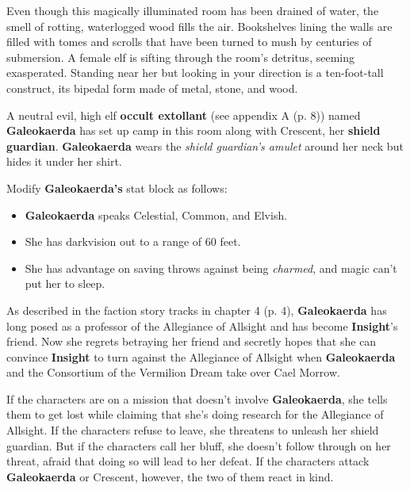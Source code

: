 \documentclass[a4paper, 11pt, bg=full, twocolumn, nooutline]{dndbook}
\begin{document}
\begin{DndReadAloud}
Even though this magically illuminated room has been drained of water, the smell of rotting, waterlogged wood fills the air. Bookshelves lining the walls are filled with tomes and scrolls that have been turned to mush by centuries of submersion.
A female elf is sifting through the room's detritus, seeming exasperated. Standing near her but looking in your direction is a ten-foot-tall construct, its bipedal form made of metal, stone, and wood.
\end{DndReadAloud}

A neutral evil, high elf \textbf{occult extollant} (see appendix A (p. 8)) named \textbf{Galeokaerda} has set up camp in this room along with Crescent, her \textbf{shield guardian}. \textbf{Galeokaerda} wears the \textit{shield guardian's amulet} around her neck but hides it under her shirt.

Modify \textbf{Galeokaerda's} stat block as follows:

\begin{itemize}
\item \textbf{Galeokaerda} speaks Celestial, Common, and Elvish.
\item She has darkvision out to a range of 60 feet.
\item She has advantage on saving throws against being \textit{charmed}, and magic can't put her to sleep.
\end{itemize}

As described in the faction story tracks in chapter 4 (p. 4), \textbf{Galeokaerda} has long posed as a professor of the Allegiance of Allsight and has become \textbf{Insight}'s friend. Now she regrets betraying her friend and secretly hopes that she can convince \textbf{Insight} to turn against the Allegiance of Allsight when \textbf{Galeokaerda} and the Consortium of the Vermilion Dream take over Cael Morrow.


If the characters are on a mission that doesn't involve \textbf{Galeokaerda}, she tells them to get lost while claiming that she's doing research for the Allegiance of Allsight. If the characters refuse to leave, she threatens to unleash her shield guardian. But if the characters call her bluff, she doesn't follow through on her threat, afraid that doing so will lead to her defeat. If the characters attack \textbf{Galeokaerda} or Crescent, however, the two of them react in kind.
\end{document}
